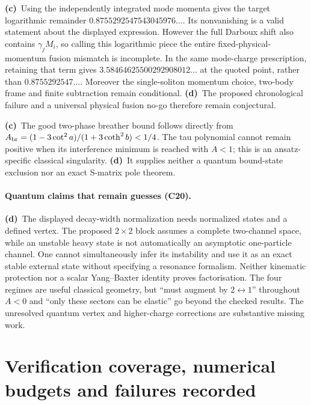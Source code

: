 \documentclass[11pt,a4paper]{article}
\newcommand{\Lc}{\textbf{(c)}\ }
\newcommand{\Ld}{\textbf{(d)}\ }
\begin{document}
\Lc Using the independently integrated mode momenta gives the target
logarithmic remainder $0.8755292547543045976\ldots$. Its nonvanishing is a
valid statement about the displayed expression. However the full Darboux
shift also contains $\gamma_jM_i$, so calling this logarithmic piece the
entire fixed-physical-momentum fusion mismatch is incomplete. In the same
mode-charge prescription, retaining that term gives
$3.58464625500292908012\ldots$ at the quoted point, rather than
$0.8755292547\ldots$. Moreover the
single-soliton momentum choice, two-body frame and finite subtraction remain
conditional. \Ld The proposed chronological failure and a universal physical
fusion no-go therefore remain conjectural.

\Lc The good two-phase breather bound follows directly from
$A_{\rm br}=(1-3\cot^2a)/(1+3\coth^2b)<1/4$. The tau polynomial cannot
remain positive when its interference minimum is reached with $A<1$;
this is an ansatz-specific classical singularity. \Ld It supplies neither a
quantum bound-state exclusion nor an exact S-matrix pole theorem.

\paragraph{Quantum claims that remain guesses (C20).}
\Ld The displayed decay-width normalization needs normalized states and a
defined vertex. The proposed $2\times2$ block assumes a complete two-channel
space, while an unstable heavy state is not automatically an asymptotic
one-particle channel. One cannot simultaneously infer its instability and
use it as an exact stable external state without specifying a resonance
formalism. Neither kinematic protection nor a scalar Yang--Baxter identity
proves factorisation. The four regimes are useful classical geometry, but
``must augment by $2\leftrightarrow1$'' throughout $A<0$ and ``only these
sectors can be elastic'' go beyond the checked results. The unresolved
quantum vertex and higher-charge corrections are substantive missing work.

\section{Verification coverage, numerical budgets and failures recorded}
\end{document}
